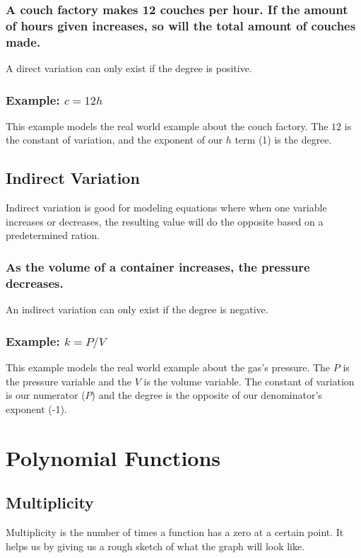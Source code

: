 \documentclass[12pt, english]{article}
\begin{document}
	\subsubsection*{A couch factory makes 12 couches per hour. If the amount of hours
	given increases, so will the total amount of couches made.}
	A direct variation can only exist if the degree is positive.
	\subsubsection*{Example: $c = 12h$}
	This example models the real world example about the couch factory. The $12$ is the constant of variation, and the exponent of our $h$
	term (1) is the degree.
	\subsection{Indirect Variation}
	Indirect variation is good for modeling equations where when one variable increases or decreases, the resulting value will do the opposite
	based on a predetermined ration.
	\subsubsection*{As the volume of a container increases, the pressure decreases.}
	An indirect variation can only exist if the degree is negative.
	\subsubsection*{Example: $k = P/V$}
	This example models the real world example about the gas's pressure. The $P$ is the pressure variable and the $V$ is the volume variable.
	The constant of variation is our numerator ($P$) and the degree is the opposite of our denominator's exponent (-1).
	\section{Polynomial Functions}
	\subsection{Multiplicity}
	Multiplicity is the number of times a function has a zero at a certain point. It helps us by giving us a rough sketch of what the graph will
	look like.
\end{document}

